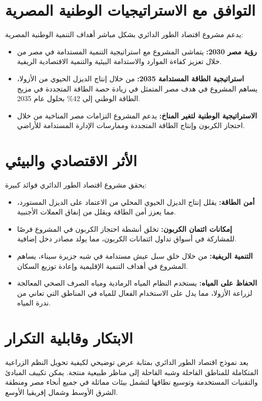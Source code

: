 \section{التوافق مع الاستراتيجيات الوطنية المصرية}

يدعم مشروع اقتصاد الطور الدائري بشكل مباشر أهداف التنمية الوطنية المصرية:

\begin{itemize}
    \item \textbf{رؤية مصر 2030:} يتماشى المشروع مع استراتيجية التنمية المستدامة في مصر من خلال تعزيز كفاءة الموارد والاستدامة البيئية والتنمية الاقتصادية الريفية.
    
    \item \textbf{استراتيجية الطاقة المستدامة 2035:} من خلال إنتاج الديزل الحيوي من الأزولا، يساهم المشروع في هدف مصر المتمثل في زيادة حصة الطاقة المتجددة في مزيج الطاقة الوطني إلى 42\% بحلول عام 2035.
    
    \item \textbf{الاستراتيجية الوطنية لتغير المناخ:} يدعم المشروع التزامات مصر المناخية من خلال احتجاز الكربون وإنتاج الطاقة المتجددة وممارسات الإدارة المستدامة للأراضي.
\end{itemize}

\section{الأثر الاقتصادي والبيئي}

يحقق مشروع اقتصاد الطور الدائري فوائد كبيرة:

\begin{itemize}
    \item \textbf{أمن الطاقة:} يقلل إنتاج الديزل الحيوي المحلي من الاعتماد على الديزل المستورد، مما يعزز أمن الطاقة ويقلل من إنفاق العملات الأجنبية.
    
    \item \textbf{إمكانات ائتمان الكربون:} تخلق أنشطة احتجاز الكربون في المشروع فرصًا للمشاركة في أسواق تداول ائتمانات الكربون، مما يولد مصادر دخل إضافية.
    
    \item \textbf{التنمية الريفية:} من خلال خلق سبل عيش مستدامة في شبه جزيرة سيناء، يساهم المشروع في أهداف التنمية الإقليمية وإعادة توزيع السكان.
    
    \item \textbf{الحفاظ على المياه:} يستخدم النظام المياه الرمادية ومياه الصرف الصحي المعالجة لزراعة الأزولا، مما يدل على الاستخدام الفعال للمياه في المناطق التي تعاني من ندرة المياه.
\end{itemize}

\section{الابتكار وقابلية التكرار}

يعد نموذج اقتصاد الطور الدائري بمثابة عرض توضيحي لكيفية تحويل النظم الزراعية المتكاملة للمناطق القاحلة وشبه القاحلة إلى مناظر طبيعية منتجة. يمكن تكييف المبادئ والتقنيات المستخدمة وتوسيع نطاقها لتشمل بيئات مماثلة في جميع أنحاء مصر ومنطقة الشرق الأوسط وشمال إفريقيا الأوسع.

